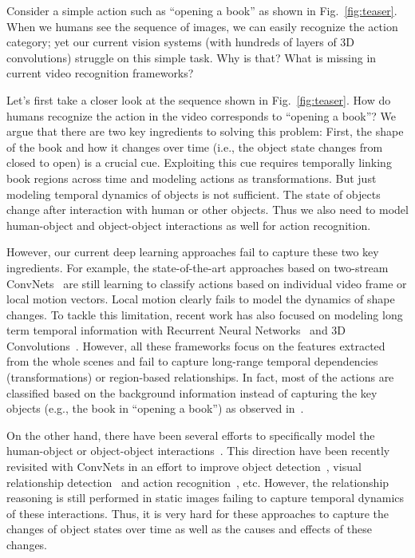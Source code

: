 \documentclass[runningheads]{llncs}
\begin{document}
Consider a simple action such as ``opening a book'' as shown in Fig.~\ref{fig:teaser}. When we humans see the sequence of images, we can easily recognize the action category; yet our current vision systems (with hundreds of layers of 3D convolutions) struggle on this simple task. Why is that? What is missing in current video recognition frameworks?

Let's first take a closer look at the sequence shown in Fig.~\ref{fig:teaser}. How do humans recognize the action in the video corresponds to ``opening a book''? We argue that there are two key ingredients to solving this problem: First, the shape of the book and how it changes over time (i.e., the object state changes from closed to open)  is a crucial cue. Exploiting this cue requires temporally linking book regions across time and modeling actions as transformations. But just modeling temporal dynamics of objects is not sufficient. The state of objects change after interaction with human or other objects. Thus we also need to model human-object and object-object interactions as well for action recognition. 

However, our current deep learning approaches fail to capture these two key ingredients. For example, the state-of-the-art approaches based on two-stream ConvNets~\cite{Simonyan2014,WangXWQLTV16} are still learning to classify actions based on individual video frame or local motion vectors. Local motion clearly fails to model the dynamics of shape changes. To tackle this limitation, recent work has also focused on modeling long term temporal information with Recurrent Neural Networks~\cite{Yue-HeiNg2015,Donahue2015LRCN,li2017temporal,miech2017learnable} and 3D Convolutions~\cite{Tran2015,Carreira2017,Tran18,Xie17}. However, all these frameworks focus on the features extracted from the whole scenes and fail to capture long-range 
temporal dependencies (transformations) or region-based relationships. In fact, most of the actions are classified based on the background information instead of capturing the key objects (e.g., the book in ``opening a book'') as observed in~\cite{sigurdsson2017actions}. 

On the other hand, there have been several efforts to specifically model the human-object or object-object interactions~\cite{Gupta09PAMI,Yao10CVPR}. This direction have been recently revisited with ConvNets in an effort to improve object detection~\cite{yatskar2016,HuCVPR18,gkioxari2017interactnet}, visual relationship detection~\cite{Lu16ECCV} and action recognition~\cite{rstarcnn}, etc. However, the relationship reasoning is still performed in static images failing to capture temporal dynamics of these interactions. Thus, it is very hard for these approaches to capture the changes of object states over time as well as the causes and effects of these changes. 
\end{document}
